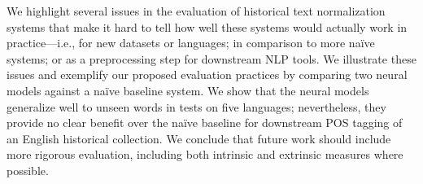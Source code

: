 We highlight several issues in the evaluation of historical text normalization systems that make it hard to tell how well these systems would actually work in practice---i.e., for new datasets or languages; in comparison to more naïve systems; or as a preprocessing step for downstream NLP tools. We illustrate these issues and exemplify our proposed evaluation practices by comparing two neural models against a naïve baseline system. We show that the neural models generalize well to unseen words in tests on five languages; nevertheless, they provide no clear benefit over the naïve baseline for downstream POS tagging of an English historical collection. We conclude that future work should include more rigorous evaluation, including both intrinsic and extrinsic measures where possible.
